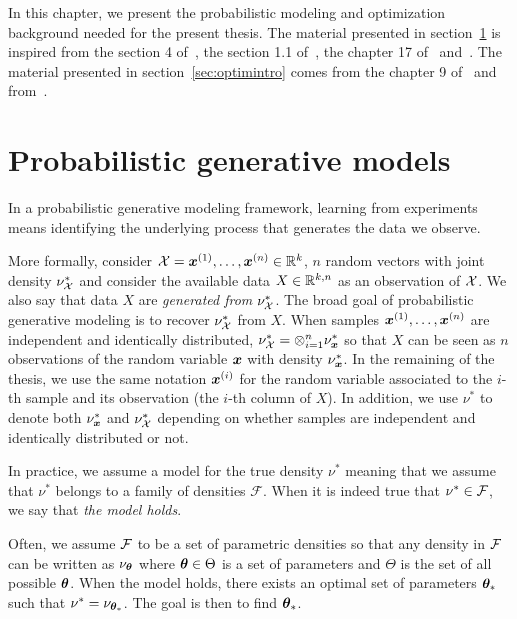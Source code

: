 In this chapter, we present the probabilistic modeling and
optimization background needed for the present thesis. The material presented in
section~\ref{sec:probgenmodel} is inspired
from the section 4 of~\cite{levy2012probabilistic}, the section 1.1
of~\cite{ablin2019exploration}, the chapter 17 of~\cite{ferguson2017course}
and~\cite{stein1956inadmissibility}. The material presented in
section~\ref{sec:optimintro} comes from the chapter 9 of~\cite{boyd2004convex}
and from~\cite{neal1998view}.

\section{Probabilistic generative models}
\label{sec:probgenmodel}
In a probabilistic generative modeling framework, learning from experiments means identifying the underlying process that generates the data we observe.

More formally, consider $\mathcal{X} = \boldsymbol{x}^{(1)}, \dots, \boldsymbol{x}^{(n)} \in \mathbb{R}^k$, $n$ random
vectors with joint density $\nu^*_{\mathcal{X}}$ and consider the available data $X \in \mathbb{R}^{k,
  n}$ as an observation of $\mathcal{X}$. We also say that data $X$ are \emph{generated from} $\nu^*_{\mathcal{X}}$.
The broad goal of probabilistic generative modeling is to recover $\nu^*_{\mathcal{X}}$ from $X$. When samples $\boldsymbol{x}^{(1)},
\dots, \boldsymbol{x}^{(n)}$ are independent and identically distributed,
$\nu^*_{\mathcal{X}} = \otimes_{i=1}^n \nu^*_{\boldsymbol{x}}$ so that
$X$ can be seen as $n$ observations of the random variable $\boldsymbol{x}$ with density
$\nu^*_{\boldsymbol{x}}$. In the remaining of the thesis, we use the same notation $\boldsymbol{x}^{(i)}$ for the random variable associated to the $i$-th sample and its observation (the $i$-th column
of $X$). In addition, we use $\nu^*$ to denote both $\nu^*_{\boldsymbol{x}}$ and $\nu^*_{\mathcal{X}}$ 
depending on whether samples are independent and identically
distributed or not.

In practice, we assume a model for the true density $\nu^*$ meaning that we
assume that $\nu^*$ belongs to a family of densities $\mathcal{F}$.
When it is indeed true that $\nu^* \in \mathcal{F}$, we say that \emph{the model holds}.

Often, we assume $\mathcal{F}$ to be a set of parametric densities so
that any density in $\mathcal{F}$ can be written as $\nu_{\boldsymbol{\theta}}$ where
$\boldsymbol{\theta} \in \Theta$ is a set of parameters and $\Theta$ is the set of all
possible $\boldsymbol{\theta}$. When the model holds, there exists an optimal
set of parameters $\boldsymbol{\theta}_*$ such that $\nu^* = \nu_{\boldsymbol{\theta}_*}$. The goal is then
to find $\boldsymbol{\theta}_*$.


